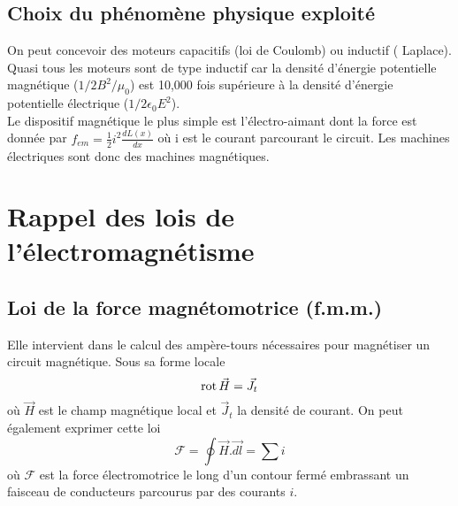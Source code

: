 	\subsection{Choix du phénomène physique exploité}
	On peut concevoir des moteurs capacitifs (loi de Coulomb) ou inductif (
	Laplace). Quasi tous les moteurs sont de type inductif car la densité 
	d'énergie potentielle magnétique ($1/2B^2/\mu_0$) est 10,000 fois 
	supérieure à la densité d'énergie potentielle électrique ($1/2\epsilon_0
	E^2$).\\
	Le dispositif magnétique le plus simple est l'électro-aimant dont 
	la force est donnée par $f_{em} = \frac{1}{2} i^2\frac{dL(x)}{dx}$ où i 
	est le courant parcourant le circuit. Les machines électriques sont donc des machines magnétiques. 
	
	
	
\section{Rappel des lois de l'électromagnétisme}
	\subsection{Loi de la force magnétomotrice (f.m.m.)}
	Elle intervient dans le calcul des ampère-tours nécessaires pour 
	magnétiser un circuit magnétique. Sous sa forme locale 
	\begin{equation}
	\rot \vec{H} = \vec{J}_t
	\end{equation}
	où $\vec{H}$ est le champ magnétique local et $\vec{J}_t$ la 
	densité de courant. On peut également exprimer cette loi 
	\begin{equation}
	\mathcal{F} = \oint \vec{H}.\vec{dl} = \sum i
	\end{equation}
	où $\mathcal{F}$ est la force électromotrice le long d'un contour 
	fermé embrassant un faisceau de conducteurs parcourus par des 
	courants $i$.
	
